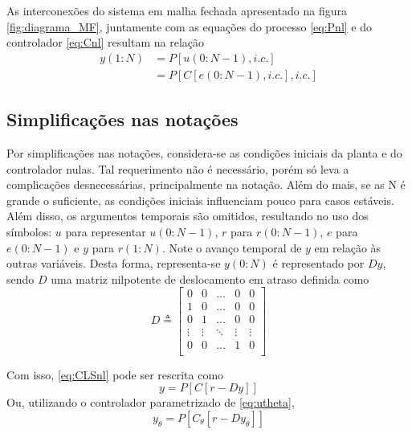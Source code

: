 As interconexões do sistema em malha fechada apresentado na figura \ref{fig:diagrama_MF}, juntamente com as equações do processo \eqref{eq:Pnl} e do controlador \eqref{eq:Cnl} resultam na relação
\begin{align}
   y(1: N) &=P[u(0{:} N-1), i . c .] \nonumber \\
   &=P[C[e(0{:} N-1), i . c .], i . c .]
   \label{eq:CLSnl}
\end{align}

\subsection{Simplificações nas notações}%
\label{sub:simplificações_nas_notações}

Por simplificações nas notações, considera-se as condições iniciais da planta e do controlador nulas. Tal requerimento não é necessário, porém só leva  a complicações desnecessárias, principalmente na notação. Além do mais, se as N é grande o suficiente, as condições iniciais influenciam pouco para casos estáveis.
Além disso, os argumentos temporais são omitidos, resultando no uso dos símbolos: $u$ para representar $u(0{:}N-1)$, $r$ para $r(0{:}N-1)$, $e$ para $e(0{:}N-1)$ e  $y$ para $r(1{:}N)$. Note o avanço temporal de $y$ em relação às outras variáveis. Desta forma, representa-se  $y(0{:}N)$ é representado por $Dy$, sendo $D$ uma matriz nilpotente de deslocamento em atraso definida como
\begin{equation}
   D \triangleq \begin{bmatrix} 
      0 & 0 & \dots & 0 & 0 \\
      1 & 0 & \dots & 0 & 0 \\
      0 & 1 & \dots & 0 & 0 \\
      \vdots & \vdots & \ddots & \vdots & \vdots \\
      0 & 0 & \dots & 1 & 0 \\
   \end{bmatrix} 
\label{eq:}
\end{equation}

Com isso, \eqref{eq:CLSnl} pode ser rescrita como
\begin{equation}
   y = P[C[r-Dy]]
   \label{eq:ymf}
\end{equation}
Ou, utilizando o controlador parametrizado de \eqref{eq:utheta},
\begin{equation}
   y_{\theta} = P[C_{\theta}[r-Dy_{\theta}]]
   \label{eq:ytheta}
\end{equation}


